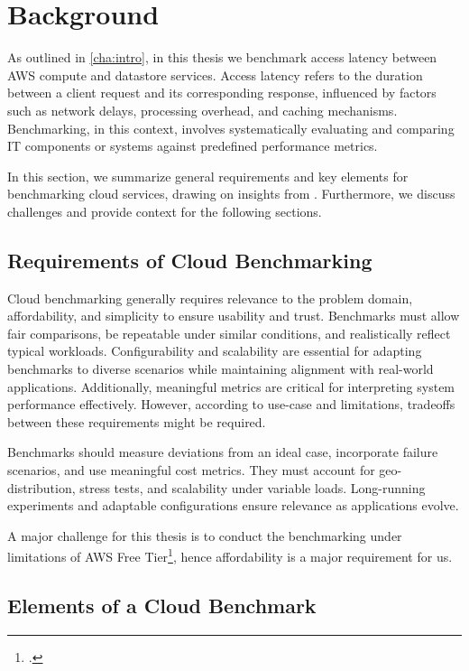 \section{Background}
\label{cha:background}

As outlined in \cref{cha:intro}, in this thesis we benchmark access latency between AWS compute and datastore services. Access latency refers to the duration between a client request and its corresponding response, influenced by factors such as network delays, processing overhead, and caching mechanisms. Benchmarking, in this context, involves systematically evaluating and comparing IT components or systems against predefined performance metrics.

In this section, we summarize general requirements and key elements for benchmarking cloud services, drawing on insights from \cite{book_bermbach_cloud_service_benchmarking,paper_cooper_ycsb,paper_folkerts_benchmarking,paper_binnig_weather}. Furthermore, we discuss challenges and provide context for the following sections.

\subsection{Requirements of Cloud Benchmarking}

Cloud benchmarking generally requires relevance to the problem domain, affordability, and simplicity to ensure usability and trust. Benchmarks must allow fair comparisons, be repeatable under similar conditions, and realistically reflect typical workloads. Configurability and scalability are essential for adapting benchmarks to diverse scenarios while maintaining alignment with real-world applications. Additionally, meaningful metrics are critical for interpreting system performance effectively. However, according to use-case and limitations, tradeoffs between these requirements might be required.

Benchmarks should measure deviations from an ideal case, incorporate failure scenarios, and use meaningful cost metrics. They must account for geo-distribution, stress tests, and scalability under variable loads. Long-running experiments and adaptable configurations ensure relevance as applications evolve.

A major challenge for this thesis is to conduct the benchmarking under limitations of AWS Free Tier\footcite{https://aws.amazon.com/free/}, hence affordability is a major requirement for us. 

\subsection{Elements of a Cloud Benchmark}
\label{elems_of_bench}

